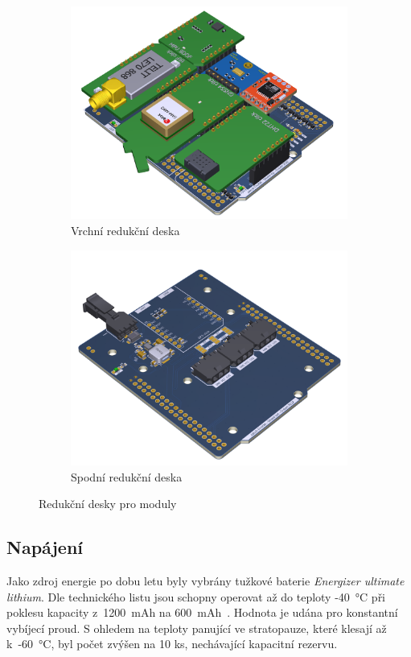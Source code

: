 \documentclass[twoside]{ctuthesis}
\theoremstyle{plain}
\theoremstyle{definition}
\theoremstyle{note}
\begin{document}
		\begin{figure}[hbtp]
			\centering
			\begin{subfigure}{0.49\textwidth}
				\centering
				\includegraphics[height=0.7\linewidth]{Figures/shield_top.png} 
				\caption{Vrchní redukční deska}
				\label{fig:shield:top}
			\end{subfigure}%
			\begin{subfigure}{.49\textwidth}
				\centering
				\includegraphics[height=0.7\linewidth]{Figures/shield_bot.png}
				\caption{Spodní redukční deska}
				\label{fig:shield:bot}
			\end{subfigure}
			\caption{Redukční desky pro moduly}
			\label{fig:shields:DPS}
		\end{figure}



		
		\subsection{Napájení}
		Jako zdroj energie po dobu letu byly vybrány tužkové baterie \textit{Energizer ultimate lithium}. Dle technického listu jsou schopny operovat až do teploty -40~°C při poklesu kapacity z~1200~mAh na 600~mAh~\cite{dsh_AA}. Hodnota je udána pro konstantní vybíjecí proud. S ohledem na teploty panující ve stratopauze, které klesají až k~-60~°C, byl počet zvýšen na 10 ks, nechávající kapacitní rezervu. 
\end{document}
